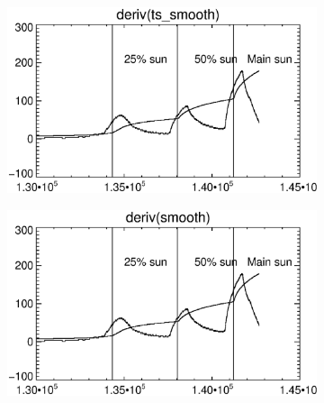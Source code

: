 \documentclass[10pt]{article}
\begin{document}
\begin{figure}[!h]
    \centering 
    \hspace{-1.0in}
    \begin{subfigure}[b]{.45\linewidth}
        \centering
        \includegraphics[width=1.3\textwidth]{plots_tables_images/d_ts.eps}
    \end{subfigure}
    \hspace{.5in}
    \begin{subfigure}[b]{.45\linewidth}
        \centering
        \includegraphics[width=1.3\textwidth]{plots_tables_images/d_reg.eps}
    \end{subfigure}
   

\end{figure}
\end{document}
